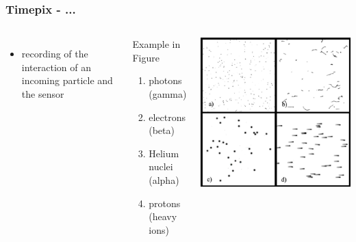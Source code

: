 \documentclass[aspectratio=169]{beamer}
\begin{document}
\begin{frame}
\frametitle{Timepix - ...}

\begin{columns}[c]


\begin{itemize}
  \item recording of the interaction of an incoming particle and the sensor
\end{itemize}

\begin{block}{Example in Figure}
\begin{enumerate}[label=(\alph*)]
  \item photons (gamma)
  \item electrons (beta)
  \item Helium nuclei (alpha)
  \item protons (heavy ions)
\end{enumerate}
\end{block}

\includegraphics[width=1.0\textwidth]{./fig/particle_types_inverted.png}

\end{columns}

\end{frame}
\end{document}
